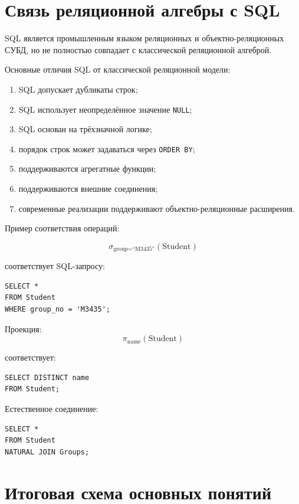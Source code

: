 \documentclass[12pt,a4paper]{article}
\theoremstyle{remark}
\begin{document}
\section{Связь реляционной алгебры с SQL}

SQL является промышленным языком реляционных и объектно-реляционных СУБД, но не полностью совпадает с классической реляционной алгеброй.

Основные отличия SQL от классической реляционной модели:
\begin{enumerate}
    \item SQL допускает дубликаты строк;
    \item SQL использует неопределённое значение \texttt{NULL};
    \item SQL основан на трёхзначной логике;
    \item порядок строк может задаваться через \texttt{ORDER BY};
    \item поддерживаются агрегатные функции;
    \item поддерживаются внешние соединения;
    \item современные реализации поддерживают объектно-реляционные расширения.
\end{enumerate}

Пример соответствия операций:

\[
\sigma_{\text{group}=\text{``M3435''}}(\text{Student})
\]

соответствует SQL-запросу:

\begin{lstlisting}[style=sqlstyle]
SELECT *
FROM Student
WHERE group_no = 'M3435';
\end{lstlisting}

Проекция:
\[
\pi_{\text{name}}(\text{Student})
\]

соответствует:

\begin{lstlisting}[style=sqlstyle]
SELECT DISTINCT name
FROM Student;
\end{lstlisting}

Естественное соединение:

\begin{lstlisting}[style=sqlstyle]
SELECT *
FROM Student
NATURAL JOIN Groups;
\end{lstlisting}

\section{Итоговая схема основных понятий}
\end{document}
